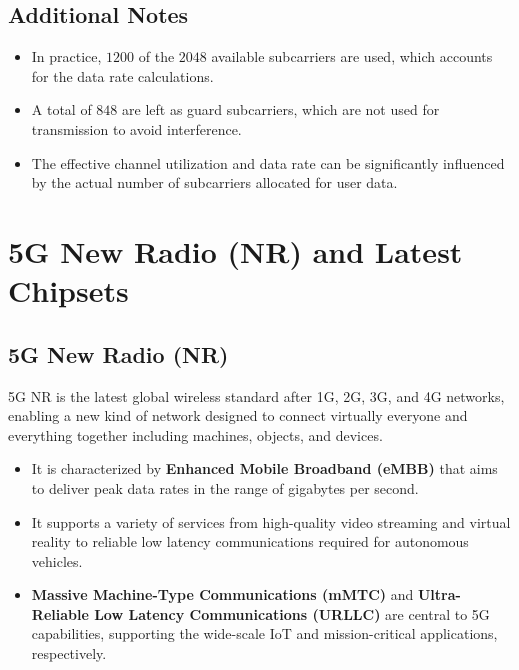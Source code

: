\subsection*{Additional Notes}

\begin{itemize}
    \item In practice, \(1200\) of the \(2048\) available subcarriers are used, which accounts for the data rate calculations.
    \item A total of \(848\) are left as guard subcarriers, which are not used for transmission to avoid interference.
    \item The effective channel utilization and data rate can be significantly influenced by the actual number of subcarriers allocated for user data.
\end{itemize}








\section*{5G New Radio (NR) and Latest Chipsets}

\subsection*{5G New Radio (NR)}
5G NR is the latest global wireless standard after 1G, 2G, 3G, and 4G networks, enabling a new kind of network designed to connect virtually everyone and everything together including machines, objects, and devices.

\begin{itemize}
    \item It is characterized by \textbf{Enhanced Mobile Broadband (eMBB)} that aims to deliver peak data rates in the range of gigabytes per second.
    \item It supports a variety of services from high-quality video streaming and virtual reality to reliable low latency communications required for autonomous vehicles.
    \item \textbf{Massive Machine-Type Communications (mMTC)} and \textbf{Ultra-Reliable Low Latency Communications (URLLC)} are central to 5G capabilities, supporting the wide-scale IoT and mission-critical applications, respectively.
\end{itemize}

